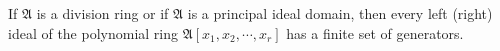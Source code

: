 If $\mathfrak{A}$ is a division ring or if $\mathfrak{A}$ is a principal ideal domain, then every left (right) ideal of the polynomial ring $\mathfrak{A}[x_1, x_2, \cdots, x_r]$ has a finite set of generators.
